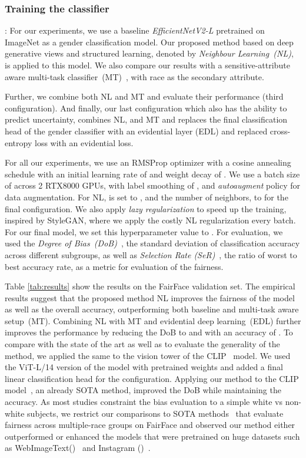 \documentclass[runningheads]{llncs}
\begin{document}
\subsubsection{\textbf{Training the classifier}}: For our experiments, we use a baseline \emph{EfficientNetV2-L} pretrained on ImageNet as a gender classification model. Our proposed method based on deep generative views and structured learning, denoted by \emph{Neighbour Learning~(NL)}, is applied to this model. We also compare our results with a sensitive-attribute aware multi-task classifier~(MT)~\cite{multitask}, with race as the secondary attribute. 

Further, we combine both NL and MT and evaluate their performance (third configuration). And finally, our last configuration which also has the ability to predict uncertainty, combines NL, and MT and replaces the final classification head of the gender classifier with an evidential layer (EDL) and replaced cross-entropy loss with an evidential loss. 

For all our experiments, we use an RMSProp optimizer with a cosine annealing schedule with an initial learning rate of  and weight decay of . We use a batch size of  across 2 RTX8000 GPUs, with label smoothing of , and \emph{autoaugment} policy for data augmentation. For NL,  is set to , and the number of neighbors,  to  for the final configuration. We also apply \emph{lazy regularization} to speed up the training, inspired by StyleGAN, where we apply the costly NL regularization every  batch. For our final model, we set this hyperparameter value to . For evaluation, we used the \emph{Degree of Bias~(DoB)}~\cite{dob}, the standard deviation of classification accuracy across different subgroups, as well as \emph{Selection Rate (SeR)}~\cite{ser}, the ratio of worst to best accuracy rate, as a metric for evaluation of the fairness.

Table \ref{tab:results} show the results on the FairFace validation set. The empirical results suggest that the proposed method NL improves the fairness of the model as well as the overall accuracy, outperforming both baseline and multi-task aware setup~(MT). Combining NL with MT and evidential deep learning~(EDL) further improves the performance by reducing the DoB to  and with an accuracy of . To compare with the state of the art as well as to evaluate the generality of the method, we applied the same to the vision tower of the CLIP~\cite{clip} model. We used the ViT-L/14 version of the model with pretrained weights and added a final linear classification head for the configuration. Applying our method to the CLIP model~\cite{clip}, an already SOTA method, improved the DoB while maintaining the accuracy. As most studies constraint the bias evaluation to a simple white vs non-white subjects, we restrict our comparisons to SOTA methods~\cite{lp_insta,clip} that evaluate fairness across multiple-race groups on FairFace and observed our method either outperformed or enhanced the models that were pretrained on huge datasets such as WebImageText()~\cite{clip} and Instagram ()~\cite{lp_insta}.
\end{document}
